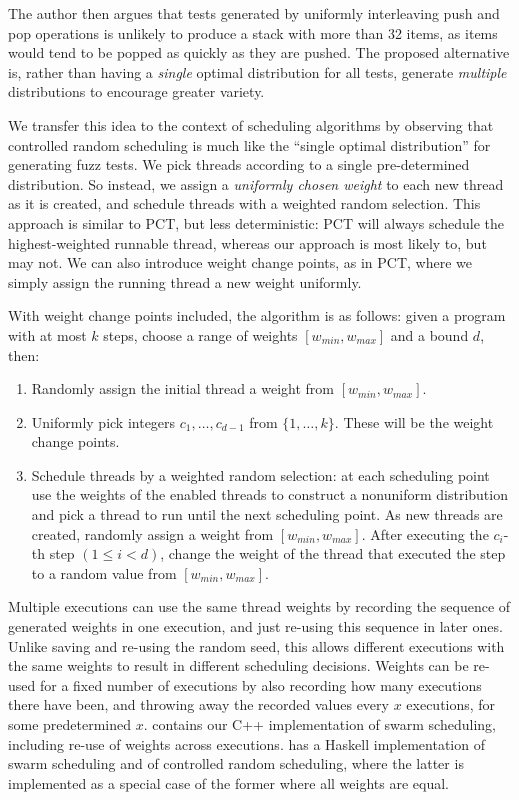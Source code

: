 The author then argues that tests generated by uniformly interleaving push and
pop operations is unlikely to produce a stack with more than 32 items, as items
would tend to be popped as quickly as they are pushed.  The proposed alternative
is, rather than having a \emph{single} optimal distribution for all tests,
generate \emph{multiple} distributions to encourage greater variety.

We transfer this idea to the context of scheduling algorithms by observing that
controlled random scheduling is much like the ``single optimal distribution''
for generating fuzz tests.  We pick threads according to a single pre-determined
distribution.  So instead, we assign a \emph{uniformly chosen weight} to each
new thread as it is created, and schedule threads with a weighted random
selection.  This approach is similar to PCT, but less deterministic: PCT will
always schedule the highest-weighted runnable thread, whereas our approach is
most likely to, but may not.  We can also introduce weight change points, as in
PCT, where we simply assign the running thread a new weight uniformly.

With weight change points included, the algorithm is as follows: given a program
with at most $k$ steps, choose a range of weights $[w_{min}, w_{max}]$ and
a bound $d$, then:

\begin{enumerate}
\item Randomly assign the initial thread a weight from $[w_{min}, w_{max}]$.
\item Uniformly pick integers $c_1, \ldots, c_{d-1}$ from $\{1, \ldots, k\}$.
These will be the weight change points.
\item Schedule threads by a weighted random selection: at each scheduling point
use the weights of the enabled threads to construct a nonuniform distribution
and pick a thread to run until the next scheduling point.  As new threads are
created, randomly assign a weight from $[w_{min}, w_{max}]$.  After executing
the $c_i$-th step $(1 \leq i < d)$, change the weight of the thread that
executed the step to a random value from $[w_{min}, w_{max}]$.
\end{enumerate}

Multiple executions can use the same thread weights by recording the sequence of
generated weights in one execution, and just re-using this sequence in later
ones.  Unlike saving and re-using the random seed, this allows different
executions with the same weights to result in different scheduling decisions.
Weights can be re-used for a fixed number of executions by also recording how
many executions there have been, and throwing away the recorded values every $x$
executions, for some predetermined $x$.   contains our C++
implementation of swarm scheduling, including re-use of weights across
executions.  \dejafu{} has a Haskell implementation of swarm scheduling and of
controlled random scheduling, where the latter is implemented as a special case
of the former where all weights are equal.

